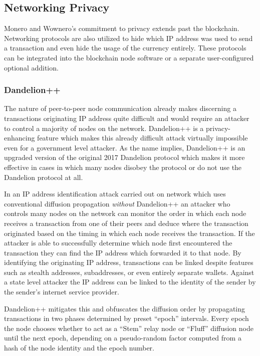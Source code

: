 \subsection{Networking Privacy}
Monero and Wownero's commitment to privacy extends past the blockchain. Networking protocols are also utilized to hide which IP address was used to send a transaction and even hide the usage of the currency entirely. These protocols can be integrated into the blockchain node software or a separate user-configured optional addition.

\subsubsection{Dandelion++}
The nature of peer-to-peer node communication already makes discerning a transactions originating IP address quite difficult and would require an attacker to control a majority of nodes on the network\cite{localmonero-dandelion}. Dandelion++\cite{dandelion} is a privacy-enhancing feature which makes this already difficult attack virtually impossible even for a government level attacker. As the name implies, Dandelion++ is an upgraded version of the original 2017 Dandelion protocol which makes it more effective in cases in which many nodes disobey the protocol or do not use the Dandelion protocol at all\cite{dandelion}.


In an IP address identification attack carried out on network which uses conventional diffusion propagation \emph{without} Dandelion++ an attacker who controls many nodes on the network can monitor the order in which each node receives a transaction from one of their peers and deduce where the transaction originated based on the timing in which each node receives the transaction. If the attacker is able to successfully determine which node first encountered the transaction they can find the IP address which forwarded it to that node\cite{localmonero-dandelion}. By identifying the originating IP address, transactions can be linked despite features such as stealth addresses, subaddresses, or even entirely separate wallets. Against a state level attacker the IP address can be linked to the identity of the sender by the sender's internet service provider\cite{localmonero-dandelion}.

Dandelion++ mitigates this and obfuscates the diffusion order by propagating transactions in two phases determined by preset ``epoch'' intervals. Every epoch the node chooses whether to act as a ``Stem'' relay node or ``Fluff'' diffusion node until the next epoch, depending on a pseudo-random factor computed from a hash of the node identity and the epoch number\cite{dandelion}.

